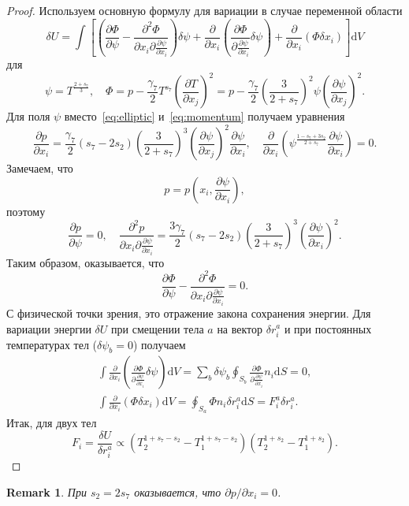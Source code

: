 \documentclass{article}
\theoremstyle{plain}
\newtheorem*{remark}{Remark}
\newcommand{\dd}{\mathrm{d}}
\newcommand{\pder}[2][]{\frac{\partial#1}{\partial#2}}
\newcommand{\pderder}[3][]{\frac{\partial^2#1}{\partial#2\partial#3}}
\newcommand{\Pder}[2][]{\partial#1/\partial#2}
\begin{document}
\begin{proof}
Используем основную формулу для вариации в случае переменной области\cite{Gelfand1961}
\begin{equation}\label{eq:variation_ell}
    \delta U = \int \left[
        \left( \pder[\Phi]{\psi} - \pderder[\Phi]{x_i}{\pder[\psi]{x_i}} \right) \delta\psi +
        \pder{x_i}\left( \pder[\Phi]{\pder[\psi]{x_i}} \delta\psi \right) +
        \pder{x_i}\left( \Phi \delta x_i \right)
    \right]\dd{V}
\end{equation}
для
\begin{equation}\label{eq:psi_Phi_definition}
    \psi = T^{\frac{2+s_7}{3}}, \quad
    \Phi = p - \frac{\gamma_7}2 T^{s_7}\left(\pder[T]{x_j}\right)^2 =
    p - \frac{\gamma_7}2 \left(\frac3{2+s_7}\right)^2 \psi \left(\pder[\psi]{x_j}\right)^2.
\end{equation}
Для поля \(\psi\) вместо~\eqref{eq:elliptic} и~\eqref{eq:momentum} получаем уравнения
\begin{equation}\label{eq:psi_equations}
    \pder[p]{x_i} = \frac{\gamma_7}2 (s_7-2s_2)\left(\frac3{2+s_7}\right)^3
        \left(\pder[\psi]{x_j}\right)^2 \pder[\psi]{x_i}, \quad
    \pder{x_i}\left( \psi^\frac{1-s_7+3s_2}{2+s_7} \pder[\psi]{x_i} \right) = 0.
\end{equation}
Замечаем, что
\begin{equation}\label{eq:pressure_psi}
    p = p\left(x_i, \pder[\psi]{x_i}\right),
\end{equation}
поэтому
\begin{equation}\label{eq:pressure_variations}
    \pder[p]{\psi} = 0, \quad \pderder[p]{x_i}{\pder[\psi]{x_i}} =
    \frac{3\gamma_7}2(s_7-2s_2)\left(\frac3{2+s_7}\right)^3\left(\pder[\psi]{x_i}\right)^2.
\end{equation}
Таким образом, оказывается, что
\begin{equation}\label{eq:eq:variation_ell1}
    \pder[\Phi]{\psi} - \pderder[\Phi]{x_i}{\pder[\psi]{x_i}} = 0.
\end{equation}
С физической точки зрения, это отражение закона сохранения энергии.
Для вариации энергии \(\delta{U}\) при смещении тела \(a\) на вектор \(\delta r^a_i\) и
при постоянных температурах тел (\(\delta \psi_b=0\)) получаем
\begin{gather}
    \int \pder{x_i}\left( \pder[\Phi]{\pder[\psi]{x_i}} \delta\psi \right) \dd{V} =
    \sum_b \delta \psi_b \oint_{S_b} \pder[\Phi]{\pder[\psi]{x_i}} n_i \dd{S} = 0, \label{eq:variation_ell2}\\
    \int \pder{x_i}\left( \Phi \delta x_i \right) \dd{V} =
    \oint_{S_a} \Phi n_i \delta r^a_i \dd{S} = F^a_i \delta r^a_i. \label{eq:variation_ell3}
\end{gather}
Итак, для двух тел
\begin{equation}\label{eq:answer}
    F_i = \frac{\delta U}{\delta r^a_i}
        \propto \left( T_2^{1+s_7-s_2} - T_1^{1+s_7-s_2} \right)\left( T_2^{1+s_2} - T_1^{1+s_2} \right).
\end{equation}

\end{proof}
\begin{remark}
    При \(s_2 = 2s_7\) оказывается, что \(\Pder[p]{x_i} = 0\).
\end{remark}
\end{document}
